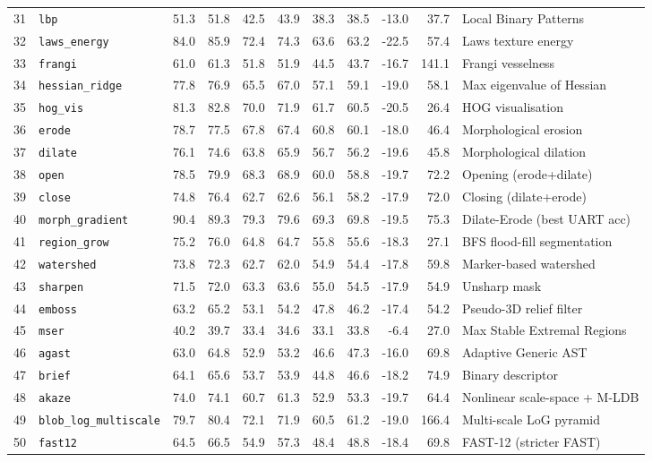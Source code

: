 \begin{landscape}
\begin{longtable}{@{}r >{\raggedright\arraybackslash\ttfamily}p{2.8cm} r r r r r r r r >{\raggedright\arraybackslash}p{3.4cm}@{}}
31 & \texttt{lbp} & 51.3 & 51.8 & 42.5 & 43.9 & 38.3 & 38.5 & -13.0 & 37.7 & Local Binary Patterns \\
32 & \texttt{laws\_energy} & 84.0 & 85.9 & 72.4 & 74.3 & 63.6 & 63.2 & -22.5 & 57.4 & Laws texture energy \\
33 & \texttt{frangi} & 61.0 & 61.3 & 51.8 & 51.9 & 44.5 & 43.7 & -16.7 & 141.1 & Frangi vesselness \\
34 & \texttt{hessian\_ridge} & 77.8 & 76.9 & 65.5 & 67.0 & 57.1 & 59.1 & -19.0 & 58.1 & Max eigenvalue of Hessian \\
35 & \texttt{hog\_vis} & 81.3 & 82.8 & 70.0 & 71.9 & 61.7 & 60.5 & -20.5 & 26.4 & HOG visualisation \\
36 & \texttt{erode} & 78.7 & 77.5 & 67.8 & 67.4 & 60.8 & 60.1 & -18.0 & 46.4 & Morphological erosion \\
37 & \texttt{dilate} & 76.1 & 74.6 & 63.8 & 65.9 & 56.7 & 56.2 & -19.6 & 45.8 & Morphological dilation \\
38 & \texttt{open} & 78.5 & 79.9 & 68.3 & 68.9 & 60.0 & 58.8 & -19.7 & 72.2 & Opening (erode+dilate) \\
39 & \texttt{close} & 74.8 & 76.4 & 62.7 & 62.6 & 56.1 & 58.2 & -17.9 & 72.0 & Closing (dilate+erode) \\
40 & \texttt{morph\_gradient} & 90.4 & 89.3 & 79.3 & 79.6 & 69.3 & 69.8 & -19.5 & 75.3 & Dilate-Erode (best UART acc) \\
41 & \texttt{region\_grow} & 75.2 & 76.0 & 64.8 & 64.7 & 55.8 & 55.6 & -18.3 & 27.1 & BFS flood-fill segmentation \\
42 & \texttt{watershed} & 73.8 & 72.3 & 62.7 & 62.0 & 54.9 & 54.4 & -17.8 & 59.8 & Marker-based watershed \\
43 & \texttt{sharpen} & 71.5 & 72.0 & 63.3 & 63.6 & 55.0 & 54.5 & -17.9 & 54.9 & Unsharp mask \\
44 & \texttt{emboss} & 63.2 & 65.2 & 53.1 & 54.2 & 47.8 & 46.2 & -17.4 & 54.2 & Pseudo-3D relief filter \\
45 & \texttt{mser} & 40.2 & 39.7 & 33.4 & 34.6 & 33.1 & 33.8 & -6.4 & 27.0 & Max Stable Extremal Regions \\
46 & \texttt{agast} & 63.0 & 64.8 & 52.9 & 53.2 & 46.6 & 47.3 & -16.0 & 69.8 & Adaptive Generic AST \\
47 & \texttt{brief} & 64.1 & 65.6 & 53.7 & 53.9 & 44.8 & 46.6 & -18.2 & 74.9 & Binary descriptor \\
48 & \texttt{akaze} & 74.0 & 74.1 & 60.7 & 61.3 & 52.9 & 53.3 & -19.7 & 64.4 & Nonlinear scale-space + M-LDB \\
49 & \texttt{blob\_log\_multiscale} & 79.7 & 80.4 & 72.1 & 71.9 & 60.5 & 61.2 & -19.0 & 166.4 & Multi-scale LoG pyramid \\
50 & \texttt{fast12} & 64.5 & 66.5 & 54.9 & 57.3 & 48.4 & 48.8 & -18.4 & 69.8 & FAST-12 (stricter FAST) \\
\end{longtable}
\end{landscape}

